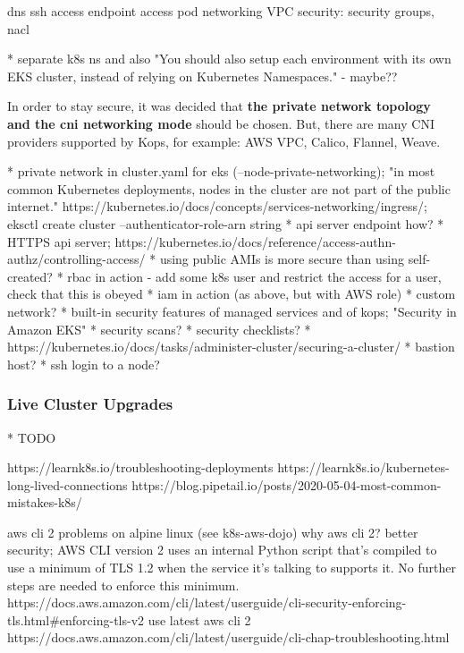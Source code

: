 dns
ssh access
endpoint access
pod networking
VPC security: security groups, nacl

* separate k8s ns and also "You should also setup each environment with its own EKS cluster, instead of relying on Kubernetes Namespaces." - maybe?? \cite{gruntwork-howto-blog}

In order to stay secure, it was decided that \textbf{the private network topology and the cni networking mode} should be chosen. But, there are many CNI providers supported by Kops, for example: AWS VPC, Calico, Flannel, Weave\cite{kops-net-topo}.

* private network in cluster.yaml for eks (--node-private-networking); "in most common Kubernetes deployments, nodes in the cluster are not part of the public internet." https://kubernetes.io/docs/concepts/services-networking/ingress/; eksctl create cluster --authenticator-role-arn string
* api server endpoint how?
* HTTPS api server; https://kubernetes.io/docs/reference/access-authn-authz/controlling-access/
* using public AMIs is more secure than using self-created?
* rbac in action - add some k8s user and restrict the access for a user, check that this is obeyed
* iam in action (as above, but with AWS role)
* custom network?
* built-in security features of managed services and of kops; "Security in Amazon EKS"
* security scans?
* security checklists?
* https://kubernetes.io/docs/tasks/administer-cluster/securing-a-cluster/
* bastion host?
* ssh login to a node?

\subsubsection{Live Cluster Upgrades}

* TODO

https://learnk8s.io/troubleshooting-deployments
https://learnk8s.io/kubernetes-long-lived-connections
https://blog.pipetail.io/posts/2020-05-04-most-common-mistakes-k8s/

aws cli 2 problems on alpine linux (see k8s-aws-dojo)
why aws cli 2? better security; AWS CLI version 2 uses an internal Python script that's compiled to use a minimum of TLS 1.2 when the service it's talking to supports it. No further steps are needed to enforce this minimum. https://docs.aws.amazon.com/cli/latest/userguide/cli-security-enforcing-tls.html#enforcing-tls-v2
 use latest aws cli 2 https://docs.aws.amazon.com/cli/latest/userguide/cli-chap-troubleshooting.html

